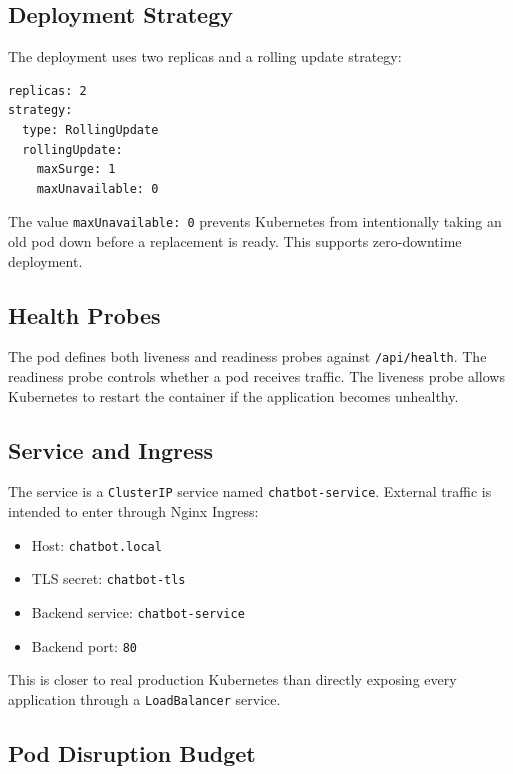 \documentclass[12pt,a4paper]{article}
\begin{document}
\subsection{Deployment Strategy}

The deployment uses two replicas and a rolling update strategy:

\begin{lstlisting}[style=projectcode]
replicas: 2
strategy:
  type: RollingUpdate
  rollingUpdate:
    maxSurge: 1
    maxUnavailable: 0
\end{lstlisting}

The value \texttt{maxUnavailable: 0} prevents Kubernetes from intentionally
taking an old pod down before a replacement is ready. This supports
zero-downtime deployment.

\subsection{Health Probes}

The pod defines both liveness and readiness probes against
\texttt{/api/health}. The readiness probe controls whether a pod receives
traffic. The liveness probe allows Kubernetes to restart the container if the
application becomes unhealthy.

\subsection{Service and Ingress}

The service is a \texttt{ClusterIP} service named \texttt{chatbot-service}.
External traffic is intended to enter through Nginx Ingress:

\begin{itemize}[leftmargin=*]
    \item Host: \texttt{chatbot.local}
    \item TLS secret: \texttt{chatbot-tls}
    \item Backend service: \texttt{chatbot-service}
    \item Backend port: \texttt{80}
\end{itemize}

This is closer to real production Kubernetes than directly exposing every
application through a \texttt{LoadBalancer} service.

\subsection{Pod Disruption Budget}
\end{document}

